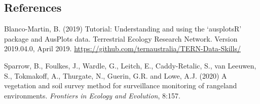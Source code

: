 \documentclass[
]{article}
\begin{document}
\hypertarget{references}{%
\subsection{References}\label{references}}

Blanco-Martin, B. (2019) Tutorial: Understanding and using the
`ausplotsR' package and AusPlots data. Terrestrial Ecology Research
Network. Version 2019.04.0, April 2019.
\url{https://github.com/ternaustralia/TERN-Data-Skills/}

Sparrow, B., Foulkes, J., Wardle, G., Leitch, E., Caddy-Retalic, S., van
Leeuwen, S., Tokmakoff, A., Thurgate, N., Guerin, G.R. and Lowe, A.J.
(2020) A vegetation and soil survey method for surveillance monitoring
of rangeland environments. \emph{Frontiers in Ecology and Evolution},
8:157.
\end{document}
